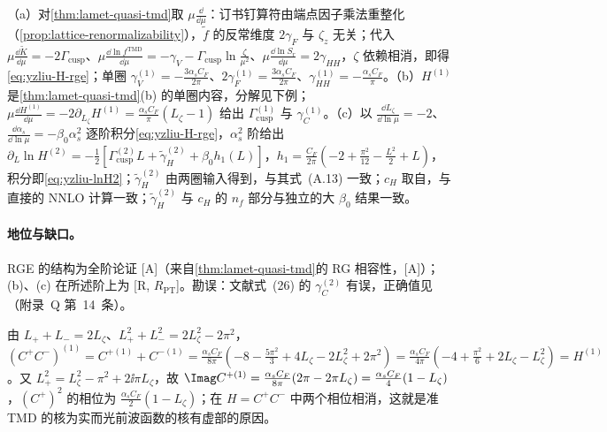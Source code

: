 \begin{proofsketch}
（a）对\cref{thm:lamet-quasi-tmd}取 $\mu\frac{\dd}{\dd\mu}$：订书钉算符由端点因子乘法重整化（\cref{prop:lattice-renormalizability}），$\tilde f$ 的反常维度 $2\gamma_F$ 与 $\zeta_z$ 无关；代入 $\mu\frac{\dd\tilde K}{\dd\mu}=-2\Gamma_{\mathrm{cusp}}$、$\mu\frac{\dd\ln f^{\mathrm{TMD}}}{\dd\mu}=-\gamma_V-\Gamma_{\mathrm{cusp}}\ln\frac{\zeta}{\mu^2}$、$\mu\frac{\dd\ln S_r}{\dd\mu}=2\gamma_{HH}$，$\zeta$ 依赖相消，即得\cref{eq:yzliu-H-rge}；单圈 $\gamma_V^{(1)}=-\frac{3\alpha_sC_F}{2\pi}$、$2\gamma_F^{(1)}=\frac{3\alpha_sC_F}{2\pi}$、$\gamma_{HH}^{(1)}=-\frac{\alpha_sC_F}{\pi}$。（b）$H^{(1)}$ 是\cref{thm:lamet-quasi-tmd}(b) 的单圈内容，分解见下例；$\mu\frac{\dd H^{(1)}}{\dd\mu}=-2\partial_{L_\zeta}H^{(1)}=\frac{\alpha_sC_F}{\pi}(L_\zeta-1)$ 给出 $\Gamma^{(1)}_{\mathrm{cusp}}$ 与 $\gamma^{(1)}_C$。（c）以 $\frac{\dd L_\zeta}{\dd\ln\mu}=-2$、$\frac{\dd\alpha_s}{\dd\ln\mu}=-\beta_0\alpha_s^2$ 逐阶积分\cref{eq:yzliu-H-rge}，$\alpha_s^2$ 阶给出 $\partial_L\ln H^{(2)}=-\frac12[\Gamma^{(2)}_{\mathrm{cusp}}L+\tilde\gamma^{(2)}_H+\beta_0h_1(L)]$，$h_1=\frac{C_F}{2\pi}(-2+\frac{\pi^2}{12}-\frac{L^2}{2}+L)$，积分即\cref{eq:yzliu-lnH2}；$\tilde\gamma^{(2)}_H$ 由两圈输入\cite[式~(A.1)--(A.5)、(A.11)]{Ji:2023pba}得到，与其式~(A.13) 一致；$c_H$ 取自\cite[式~(5.11)]{Ji:2023pba}，与直接的 NNLO 计算\cite{delRio:2023pse}一致；$\tilde\gamma^{(2)}_H$ 与 $c_H$ 的 $n_f$ 部分与独立的大 $\beta_0$ 结果\cite[式~(2.41)--(2.42)]{Liu:2023onm}一致。
\end{proofsketch}

\paragraph{地位与缺口。}RGE 的结构为全阶论证 [A]（来自\cref{thm:lamet-quasi-tmd}的 RG 相容性，[A]）；(b)、(c) 在所述阶上为 [R, $R_{\mathrm{PT}}$]。勘误：文献\cite{Ji:2019ewn}式~(26) 的 $\gamma^{(2)}_C$ 有误，正确值见\cite[式~(A.12)--(A.13)]{Ji:2023pba}（附录~Q 第~14~条）。

\begin{example}[单圈 $H=C^+_{HL}C^-_{HL}$ 与相位]\label{ex:yzliu-hl-decomposition}
由 $L_++L_-=2L_\zeta$、$L_+^2+L_-^2=2L_\zeta^2-2\pi^2$，$(C^+C^-)^{(1)}=C^{+(1)}+C^{-(1)}=\frac{\alpha_sC_F}{8\pi}(-8-\frac{5\pi^2}{3}+4L_\zeta-2L_\zeta^2+2\pi^2)=\frac{\alpha_sC_F}{4\pi}(-4+\frac{\pi^2}{6}+2L_\zeta-L_\zeta^2)=H^{(1)}$。又 $L_+^2=L_\zeta^2-\pi^2+2\ii\pi L_\zeta$，故 $\Imag C^{+(1)}=\frac{\alpha_sC_F}{8\pi}(2\pi-2\pi L_\zeta)=\frac{\alpha_sC_F}{4}(1-L_\zeta)$，$(C^+)^2$ 的相位为 $\frac{\alpha_sC_F}{2}(1-L_\zeta)$；在 $H=C^+C^-$ 中两个相位相消，这就是准 TMD 的核为实而光前波函数的核有虚部的原因。
\end{example}

